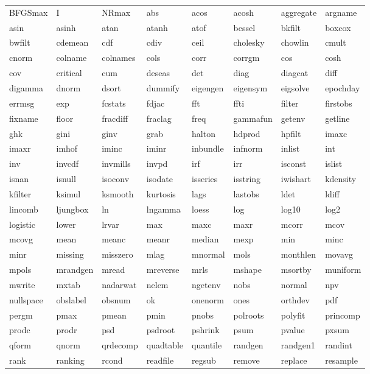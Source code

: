 \begin{tabular}{llllllll}
BFGSmax & I & NRmax & abs & acos & acosh & aggregate & argname \\
asin & asinh & atan & atanh & atof & bessel & bkfilt & boxcox \\
bwfilt & cdemean & cdf & cdiv & ceil & cholesky & chowlin & cmult \\
cnorm & colname & colnames & cols & corr & corrgm & cos & cosh \\
cov & critical & cum & deseas & det & diag & diagcat & diff \\
digamma & dnorm & dsort & dummify & eigengen & eigensym & eigsolve & epochday \\
errmsg & exp & fcstats & fdjac & fft & ffti & filter & firstobs \\
fixname & floor & fracdiff & fraclag & freq & gammafun & getenv & getline \\
ghk & gini & ginv & grab & halton & hdprod & hpfilt & imaxc \\
imaxr & imhof & iminc & iminr & inbundle & infnorm & inlist & int \\
inv & invcdf & invmills & invpd & irf & irr & isconst & islist \\
isnan & isnull & isoconv & isodate & isseries & isstring & iwishart & kdensity \\
kfilter & ksimul & ksmooth & kurtosis & lags & lastobs & ldet & ldiff \\
lincomb & ljungbox & ln & lngamma & loess & log & log10 & log2 \\
logistic & lower & lrvar & max & maxc & maxr & mcorr & mcov \\
mcovg & mean & meanc & meanr & median & mexp & min & minc \\
minr & missing & misszero & mlag & mnormal & mols & monthlen & movavg \\
mpols & mrandgen & mread & mreverse & mrls & mshape & msortby & muniform \\
mwrite & mxtab & nadarwat & nelem & ngetenv & nobs & normal & npv \\
nullspace & obslabel & obsnum & ok & onenorm & ones & orthdev & pdf \\
pergm & pmax & pmean & pmin & pnobs & polroots & polyfit & princomp \\
prodc & prodr & psd & psdroot & pshrink & psum & pvalue & pxsum \\
qform & qnorm & qrdecomp & quadtable & quantile & randgen & randgen1 & randint \\
rank & ranking & rcond & readfile & regsub & remove & replace & resample \\

\end{tabular}
